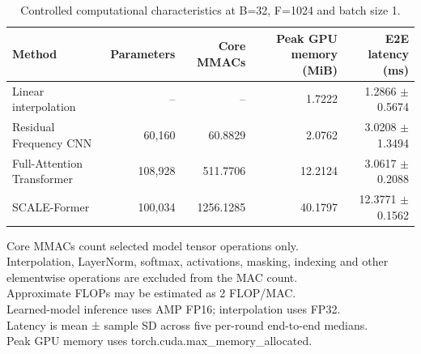 \begin{table}[t]
\centering
\caption{Controlled computational characteristics at B=32, F=1024 and batch size 1.}
\label{tab:efficiency}
\begin{tabular}{lrrrr}
\hline
Method & Parameters & Core MMACs & Peak GPU memory (MiB) & E2E latency (ms) \\
\hline
Linear interpolation & -- & -- & 1.7222 & 1.2866 $\pm$ 0.5674 \\
Residual Frequency CNN & 60,160 & 60.8829 & 2.0762 & 3.0208 $\pm$ 1.3494 \\
Full-Attention Transformer & 108,928 & 511.7706 & 12.2124 & 3.0617 $\pm$ 0.2088 \\
SCALE-Former & 100,034 & 1256.1285 & 40.1797 & 12.3771 $\pm$ 0.1562 \\
\hline
\end{tabular}
\vspace{1mm}
\begin{minipage}{0.98\textwidth}
\footnotesize
Core MMACs count selected model tensor operations only.\\
Interpolation, LayerNorm, softmax, activations, masking, indexing and other elementwise operations are excluded from the MAC count.\\
Approximate FLOPs may be estimated as 2 FLOP/MAC.\\
Learned-model inference uses AMP FP16; interpolation uses FP32.\\
Latency is mean ± sample SD across five per-round end-to-end medians.\\
Peak GPU memory uses torch.cuda.max\_memory\_allocated.\\
\end{minipage}
\end{table}
